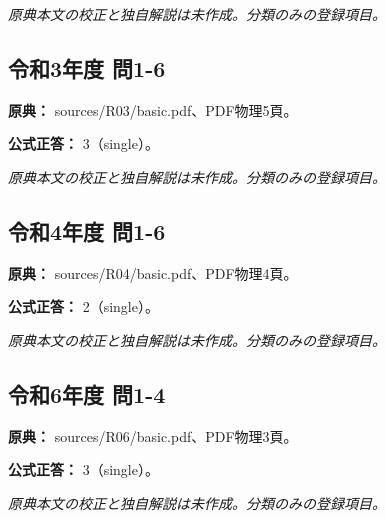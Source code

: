 \par\textit{原典本文の校正と独自解説は未作成。分類のみの登録項目。}

\subsection{令和3年度 問1-6}
\label{q:r03-reg-basic-1-6}

\noindent\textbf{原典：} sources/R03/basic.pdf、PDF物理5頁。

\textbf{公式正答：} 3（single）。

\par\textit{原典本文の校正と独自解説は未作成。分類のみの登録項目。}

\subsection{令和4年度 問1-6}
\label{q:r04-reg-basic-1-6}

\noindent\textbf{原典：} sources/R04/basic.pdf、PDF物理4頁。

\textbf{公式正答：} 2（single）。

\par\textit{原典本文の校正と独自解説は未作成。分類のみの登録項目。}

\subsection{令和6年度 問1-4}
\label{q:r06-reg-basic-1-4}

\noindent\textbf{原典：} sources/R06/basic.pdf、PDF物理3頁。

\textbf{公式正答：} 3（single）。

\par\textit{原典本文の校正と独自解説は未作成。分類のみの登録項目。}
